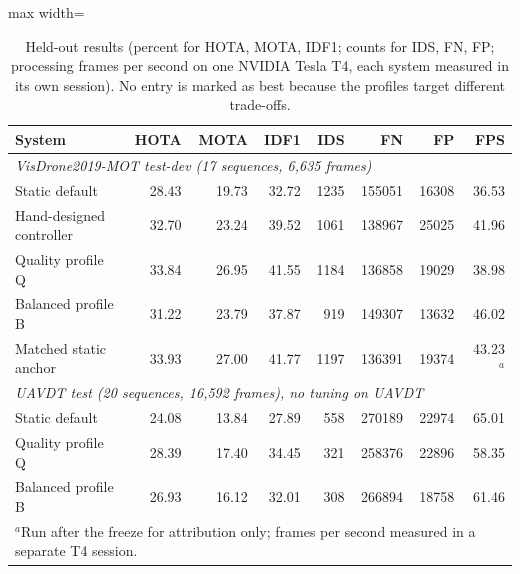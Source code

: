 \begin{table}[tbp]
\centering
\caption{Held-out results (percent for HOTA, MOTA, IDF1; counts for IDS, FN, FP; processing frames per second on one NVIDIA Tesla T4, each system measured in its own session). No entry is marked as best because the profiles target different trade-offs.}
\label{tab:ch4-main}
\small\setlength{\tabcolsep}{4pt}
\begin{adjustbox}{max width=\textwidth}
\begin{tabular}{lrrrrrrr}
\hline
System & HOTA & MOTA & IDF1 & IDS & FN & FP & FPS \\
\hline
\multicolumn{8}{l}{\textit{VisDrone2019-MOT test-dev (17 sequences, 6,635 frames)}}\\
Static default & 28.43 & 19.73 & 32.72 & 1235 & 155051 & 16308 & 36.53 \\
Hand-designed controller & 32.70 & 23.24 & 39.52 & 1061 & 138967 & 25025 & 41.96 \\
Quality profile Q & 33.84 & 26.95 & 41.55 & 1184 & 136858 & 19029 & 38.98 \\
Balanced profile B & 31.22 & 23.79 & 37.87 & 919 & 149307 & 13632 & 46.02 \\
Matched static anchor & 33.93 & 27.00 & 41.77 & 1197 & 136391 & 19374 & 43.23$^{a}$ \\
\multicolumn{8}{l}{\textit{UAVDT test (20 sequences, 16,592 frames), no tuning on UAVDT}}\\
Static default & 24.08 & 13.84 & 27.89 & 558 & 270189 & 22974 & 65.01 \\
Quality profile Q & 28.39 & 17.40 & 34.45 & 321 & 258376 & 22896 & 58.35 \\
Balanced profile B & 26.93 & 16.12 & 32.01 & 308 & 266894 & 18758 & 61.46 \\
\hline
\multicolumn{8}{l}{$^{a}$Run after the freeze for attribution only; frames per second measured in a separate T4 session.}\\
\hline
\end{tabular}
\end{adjustbox}
\end{table}
